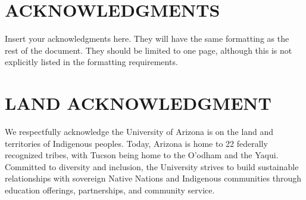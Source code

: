 \documentclass[12pt]{report} %
\begin{document}





\chapter*{ACKNOWLEDGMENTS}
\thispagestyle{fancy} %

Insert your acknowledgments here. They will have the same formatting as the rest of the document. They
should be limited to one page, although this is not explicitly listed in the formatting requirements.





\chapter*{LAND ACKNOWLEDGMENT}
\thispagestyle{fancy} %

\noindent We respectfully acknowledge the University of Arizona is on the land and territories of Indigenous peoples.
Today, Arizona is home to 22 federally recognized tribes, with Tucson being home to the O'odham and the Yaqui.
Committed to diversity and inclusion, the University strives to build sustainable relationships with sovereign
Native Nations and Indigenous communities through education offerings, partnerships, and community service.





\end{document}
